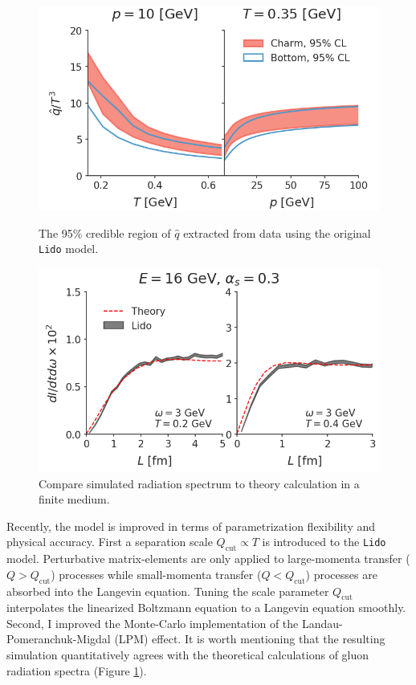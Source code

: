 \documentclass[12pt,a4paper]{revtex4-1}
\begin{document}
\begin{figure}[ht]
\centering
\begin{minipage}{.48\textwidth}
  \centering
  \includegraphics[width=\textwidth]{qhat_p_T.png}
  \caption{The 95\% credible region of $\hat{q}$ extracted from data using the original {\tt Lido} model.}\label{fig:qhat_Ds}
\end{minipage}
\hfill
\begin{minipage}{.48\textwidth}
  \centering
  \includegraphics[width=\textwidth]{spectrum_L.png}
  \caption{Compare simulated radiation spectrum to theory calculation \cite{CaronHuot:2010bp} in a finite medium.}\label{fig:spectra}
\end{minipage}
\end{figure}

Recently, the model is improved in terms of parametrization flexibility and physical accuracy. 
First a separation scale $Q_{\textrm{cut}}\propto T$ is introduced to the {\tt Lido} model. 
Perturbative matrix-elements are only applied to large-momenta transfer ($Q > Q_{\textrm{cut}}$) processes while small-momenta transfer ($Q < Q_{\textrm{cut}}$) processes are absorbed into the Langevin equation. 
Tuning the scale parameter $Q_{\textrm{cut}}$ interpolates the linearized Boltzmann equation to a Langevin equation smoothly.
Second, I improved the Monte-Carlo implementation of the Landau-Pomeranchuk-Migdal (LPM) effect.
It is worth mentioning that the resulting simulation quantitatively agrees with the theoretical calculations of gluon radiation spectra (Figure \ref{fig:spectra}).
\end{document}
